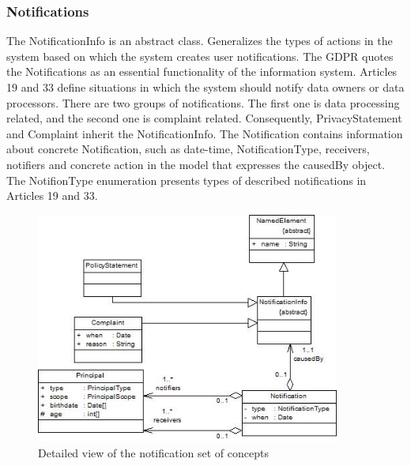 \documentclass[11pt,english]{article}
\begin{document}
\subsubsection{Notifications}
The NotificationInfo is an abstract class. Generalizes the types of actions in the system based on which the system creates user notifications. The GDPR quotes the Notifications as an essential functionality of the information system. Articles 19 and 33 define situations in which the system should notify data owners or data processors. There are two groups of notifications. The first one is data processing related, and the second one is complaint related. Consequently, PrivacyStatement and Complaint inherit the NotificationInfo. The Notification contains information about concrete Notification, such as date-time, NotificationType, receivers, notifiers and concrete action in the model that expresses the causedBy object. The NotifionType enumeration presents types of described notifications in Articles 19 and 33.
\begin{figure}[H]
    \centering
    \includegraphics[width=10cm,scale=0.5]{images/notification.jpg}
    \caption{Detailed view of the notification set of concepts}
    \label{fig:Notifications}
\end{figure}
\end{document}
